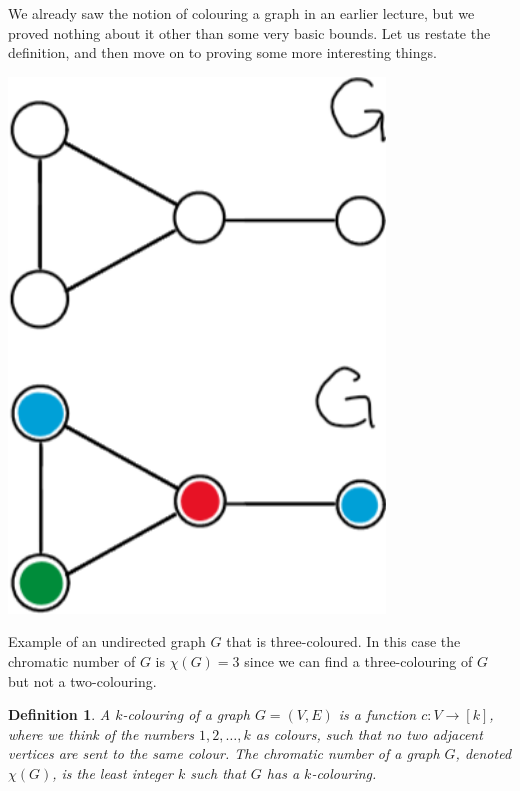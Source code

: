 \documentclass[nobib]{tufte-handout}
\newtheorem{definition}{Definition}
\begin{document}
We already saw the notion of colouring a graph in an earlier lecture, but we proved nothing about it other than some very basic bounds. Let us restate the definition, and then move on to proving some more interesting things.
\begin{marginfigure}
    \centering
    \includegraphics[width=0.75\textwidth]{graphics/L12_colouring/k-coloring.png}
    \caption{
    Example of an undirected graph $G$ that is three-coloured. In this case the chromatic number of $G$ is $\chi(G)=3$ since we can find a three-colouring of $G$ but not a two-colouring.
    }
\end{marginfigure}
\begin{definition}
  A \emph{$k$-colouring} of a graph $G = (V,E)$ is a function $c: V \to [k]$, where we think of the numbers $1,2,\ldots,k$ as colours, such that no two adjacent vertices are sent to the same colour. The \emph{chromatic number} of a graph $G$, denoted $\chi(G)$, is the least integer $k$ such that $G$ has a $k$-colouring.
\end{definition}
\end{document}
